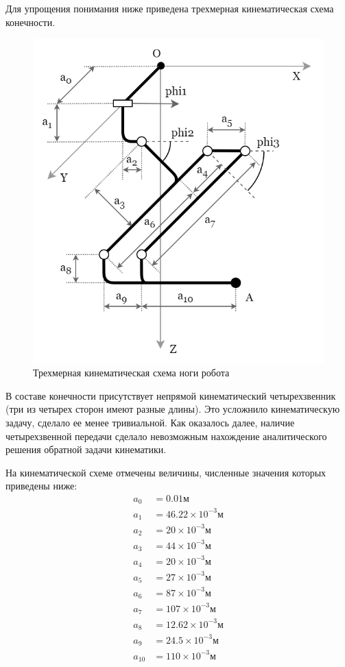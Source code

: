 Для упрощения понимания ниже приведена трехмерная кинематическая схема конечности.
\begin{figure}[h]
    \centering
    \includegraphics[scale=0.5]{chapter_kinematics/figure1.png}
    \caption{Трехмерная кинематическая схема ноги робота}
    \label{fig:kin_scheme}
\end{figure}

В составе конечности присутствует непрямой кинематический четырехзвенник (три из четырех сторон имеют разные длины). Это усложнило кинематическую задачу, сделало ее менее тривиальной. Как оказалось далее, наличие четырехзвенной передачи сделало невозможным нахождение аналитического решения обратной задачи кинематики. 

На кинематической схеме отмечены величины, численные значения которых приведены ниже:
\begin{align*}
    a_0&=0.01 м \\
    a_1&=46.22 \times 10^{-3} м \\
    a_2&=20 \times 10^{-3} м \\
    a_3&=44 \times 10^{-3} м \\
    a_4&=20 \times 10^{-3} м \\
    a_5&=27 \times 10^{-3} м \\
    a_6&=87 \times 10^{-3} м \\
    a_7&=107 \times 10^{-3} м \\
    a_8&=12.62 \times 10^{-3} м \\
    a_9&=24.5 \times 10^{-3} м \\
    a_10&=110 \times 10^{-3} м
\end{align*}

